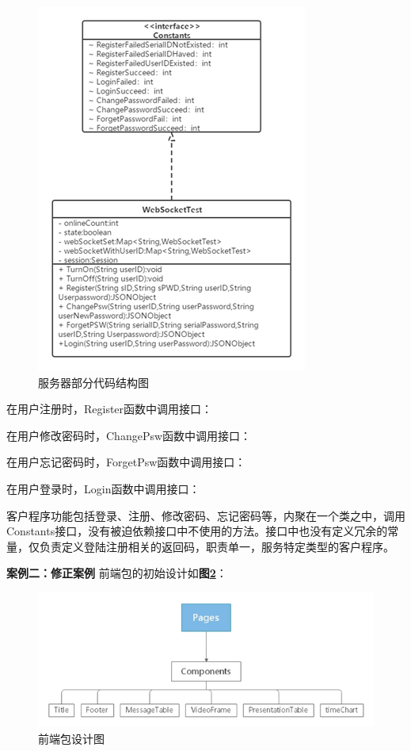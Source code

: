 \documentclass[article]{BJTU-thesis}
\begin{document}
\begin{figure}[!htbp]
	\centering
	\includegraphics[scale=0.8]{img/11.png}
	\caption{服务器部分代码结构图}\label{fig:fig11}
\end{figure}

在用户注册时，Register函数中调用接口：



在用户修改密码时，ChangePsw函数中调用接口：



\newpage
在用户忘记密码时，ForgetPsw函数中调用接口：



在用户登录时，Login函数中调用接口：



客户程序功能包括登录、注册、修改密码、忘记密码等，内聚在一个类之中，调用Constants接口，没有被迫依赖接口中不使用的方法。接口中也没有定义冗余的常量，仅负责定义登陆注册相关的返回码，职责单一，服务特定类型的客户程序。

\textbf{案例二：修正案例} 前端包的初始设计如\textbf{图\ref{fig:fig12}}：

\begin{figure}[!htbp]
	\centering
	\includegraphics[scale=0.8]{img/8.png}
	\caption{前端包设计图}\label{fig:fig12}
\end{figure}
\end{document}
